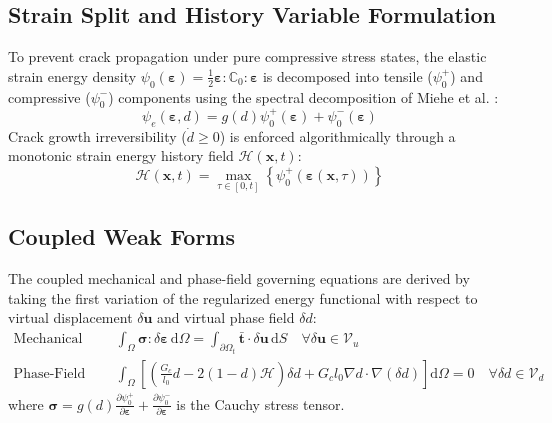\documentclass[11pt,a4paper]{article}
\begin{document}
\subsection{Strain Split and History Variable Formulation}
To prevent crack propagation under pure compressive stress states, the elastic strain energy density $\psi_0(\boldsymbol{\varepsilon}) = \frac{1}{2}\boldsymbol{\varepsilon} : \mathbb{C}_0 : \boldsymbol{\varepsilon}$ is decomposed into tensile ($\psi_0^+$) and compressive ($\psi_0^-$) components using the spectral decomposition of Miehe et al. \cite{miehe2010thermodynamically}:
\begin{equation}
    \psi_e(\boldsymbol{\varepsilon}, d) = g(d)\psi_0^+(\boldsymbol{\varepsilon}) + \psi_0^-(\boldsymbol{\varepsilon})
    \label{eq:strain_split}
\end{equation}
Crack growth irreversibility ($\dot{d} \ge 0$) is enforced algorithmically through a monotonic strain energy history field $\mathcal{H}(\mathbf{x}, t)$:
\begin{equation}
    \mathcal{H}(\mathbf{x}, t) = \max_{\tau \in [0, t]} \left\{ \psi_0^+(\boldsymbol{\varepsilon}(\mathbf{x}, \tau)) \right\}
    \label{eq:history_var}
\end{equation}

\subsection{Coupled Weak Forms}
The coupled mechanical and phase-field governing equations are derived by taking the first variation of the regularized energy functional with respect to virtual displacement $\delta\mathbf{u}$ and virtual phase field $\delta d$:
\begin{align}
    \text{Mechanical Equilibrium:} \quad & \int_\Omega \boldsymbol{\sigma} : \delta\boldsymbol{\varepsilon}\,\mathrm{d}\Omega = \int_{\partial\Omega_t} \bar{\mathbf{t}}\cdot\delta\mathbf{u}\,\mathrm{d}S \quad \forall \delta\mathbf{u} \in \mathcal{V}_u \label{eq:weak_u} \\
    \text{Phase-Field Evolution:} \quad & \int_\Omega \left[ \left( \frac{G_c}{l_0} d - 2(1-d)\mathcal{H} \right)\delta d + G_c l_0 \nabla d \cdot \nabla(\delta d) \right] \mathrm{d}\Omega = 0 \quad \forall \delta d \in \mathcal{V}_d \label{eq:weak_d}
\end{align}
where $\boldsymbol{\sigma} = g(d)\frac{\partial\psi_0^+}{\partial\boldsymbol{\varepsilon}} + \frac{\partial\psi_0^-}{\partial\boldsymbol{\varepsilon}}$ is the Cauchy stress tensor.
\end{document}
